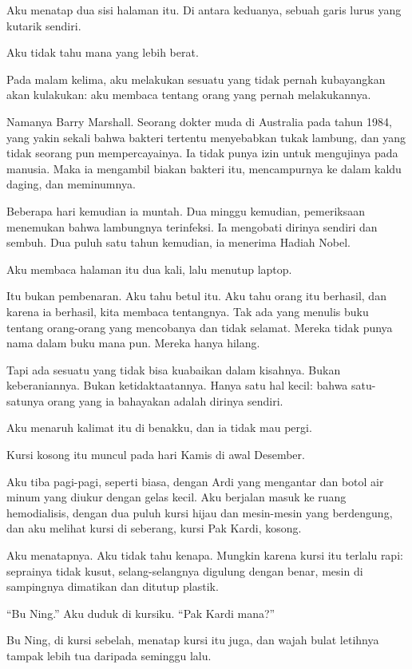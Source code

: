 \documentclass[11pt,twoside,openany]{book}
\makeatletter
\newcommand{\scenebreak}{\par\vspace{0.9em}{\centering\textsc{*\hspace{0.7em}*\hspace{0.7em}*}\par}\vspace{0.9em}\@afterindentfalse\@afterheading}
\makeatother
\begin{document}
Aku menatap dua sisi halaman itu. Di antara keduanya, sebuah garis lurus yang kutarik sendiri.

Aku tidak tahu mana yang lebih berat.

\scenebreak
Pada malam kelima, aku melakukan sesuatu yang tidak pernah kubayangkan akan kulakukan: aku membaca tentang orang yang pernah melakukannya.

Namanya Barry Marshall. Seorang dokter muda di Australia pada tahun 1984, yang yakin sekali bahwa bakteri tertentu menyebabkan tukak lambung, dan yang tidak seorang pun mempercayainya. Ia tidak punya izin untuk mengujinya pada manusia. Maka ia mengambil biakan bakteri itu, mencampurnya ke dalam kaldu daging, dan meminumnya.

Beberapa hari kemudian ia muntah. Dua minggu kemudian, pemeriksaan menemukan bahwa lambungnya terinfeksi. Ia mengobati dirinya sendiri dan sembuh. Dua puluh satu tahun kemudian, ia menerima Hadiah Nobel.

Aku membaca halaman itu dua kali, lalu menutup laptop.

Itu bukan pembenaran. Aku tahu betul itu. Aku tahu orang itu berhasil, dan karena ia berhasil, kita membaca tentangnya. Tak ada yang menulis buku tentang orang-orang yang mencobanya dan tidak selamat. Mereka tidak punya nama dalam buku mana pun. Mereka hanya hilang.

Tapi ada sesuatu yang tidak bisa kuabaikan dalam kisahnya. Bukan keberaniannya. Bukan ketidaktaatannya. Hanya satu hal kecil: bahwa satu-satunya orang yang ia bahayakan adalah dirinya sendiri.

Aku menaruh kalimat itu di benakku, dan ia tidak mau pergi.

\scenebreak
Kursi kosong itu muncul pada hari Kamis di awal Desember.

Aku tiba pagi-pagi, seperti biasa, dengan Ardi yang mengantar dan botol air minum yang diukur dengan gelas kecil. Aku berjalan masuk ke ruang hemodialisis, dengan dua puluh kursi hijau dan mesin-mesin yang berdengung, dan aku melihat kursi di seberang, kursi Pak Kardi, kosong.

Aku menatapnya. Aku tidak tahu kenapa. Mungkin karena kursi itu terlalu rapi: seprainya tidak kusut, selang-selangnya digulung dengan benar, mesin di sampingnya dimatikan dan ditutup plastik.

``Bu Ning.'' Aku duduk di kursiku. ``Pak Kardi mana?''

Bu Ning, di kursi sebelah, menatap kursi itu juga, dan wajah bulat letihnya tampak lebih tua daripada seminggu lalu.
\end{document}
